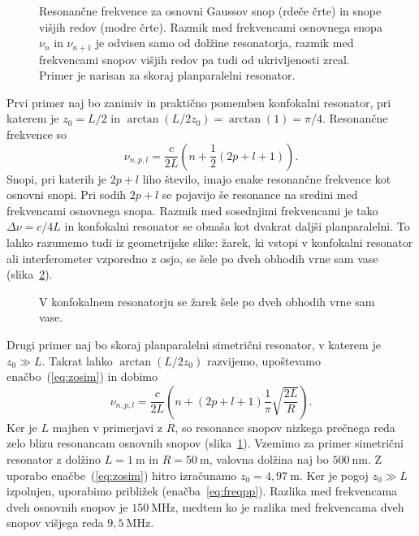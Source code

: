 \begin{figure}[ht]
\centering
\def\svgwidth{110truemm} 

\caption{Resonančne frekvence za osnovni Gaussov snop (rdeče črte) in snope višjih redov
(modre črte). Razmik med frekvencami osnovnega snopa $\nu_n$ in $\nu_{n+1}$ je odvisen 
samo od dolžine resonatorja, razmik med frekvencami snopov višjih redov pa tudi od 
ukrivljenosti zrcal. Primer je narisan za skoraj planparalelni resonator.}
\label{fig:crte}
\end{figure}
Prvi primer naj bo zanimiv in praktično pomemben konfokalni 
resonator, pri katerem je $z_{0}=L/2$ in 
$\arctan(L/2z_{0})= \arctan(1)=\pi/4$. Resonančne frekvence so 
\begin{equation}
\nu_{n,p,l}=\frac{c}{2L}\left(n+\frac{1}{2}(2p+l+1)\right)\!\!.
\label{eq:omega_konf}
\end{equation}
Snopi, pri katerih je $2p+l$ liho število, imajo enake resonančne frekvence kot
osnovni snopi. Pri sodih $2p+l$ se pojavijo še resonance na sredini
med frekvencami osnovnega snopa. Razmik med so\-sed\-nji\-mi frekvencami je tako $\Delta\nu=c/4L$
in konfokalni resonator se obnaša kot dvakrat daljši planparalelni.
To lahko razumemo tudi iz geometrijske slike: žarek, ki vstopi v konfokalni
resonator ali interferometer vzporedno z osjo, se šele po dveh obhodih vrne sam
vase (slika~\ref{fig:Konfokalni_zarek}).
\begin{figure}[ht]
\centering
\def\svgwidth{55truemm} 

\caption{V konfokalnem resonatorju se žarek šele po dveh obhodih
vrne sam vase.}
\label{fig:Konfokalni_zarek}
\end{figure}

Drugi primer naj bo skoraj planparalelni 
simetrični resonator, v katerem je $z_{0}\gg L$. Takrat lahko $\arctan(L/2z_{0})$ razvijemo, 
upoštevamo enačbo~(\ref{eq:zosim}) in dobimo
\begin{equation}
\nu_{n,p,l}=\frac{c}{2L}\left(n+(2p+l+1)\frac{1}{\pi}\sqrt{\frac{2L}{R}}\right)\!\!.
\label{eq:freqpp}
\end{equation}
Ker je $L$ majhen v primerjavi z $R$, so resonance snopov nizkega prečnega reda 
zelo blizu resonancam osnovnih snopov (slika~\ref{fig:crte}). 
Vzemimo za primer  
simetrični resonator z dolžino $L=1~\si{\metre}$ in $R=50~\si{\metre}$, 
valovna dolžina naj bo $500~\si{\nano\metre}$. Z uporabo enačbe~(\ref{eq:zosim})
hitro izračunamo $z_0 = 4,97~\si{\metre}$. Ker je pogoj $z_0\gg L$ izpolnjen,  uporabimo
približek (enačba~\ref{eq:freqpp}). Razlika med frekvencama dveh osnovnih snopov je 
$150~\si{\mega\hertz}$, medtem ko je razlika med frekvencama dveh snopov višjega reda
$9,5~\si{\mega\hertz}$.

